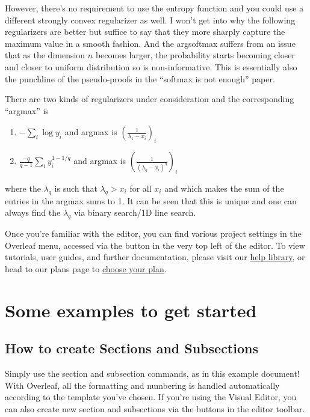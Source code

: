 \documentclass{article}
\begin{document}
However, there's no requirement to use the entropy function and you could use a different strongly convex regularizer as well. 
I won't get into why the following regularizers are better but suffice to say that they more sharply capture the maximum value in a smooth fashion. And the argsoftmax suffers from an issue that as the dimension $n$ becomes larger, the probability starts becoming closer and closer to uniform distribution so is non-informative. This is essentially also the punchline of the pseudo-proofs in the ``softmax is not enough'' paper.

There are two kinds of regularizers under consideration and the corresponding ``argmax'' is
\begin{enumerate}
\item $- \sum\limits_i \log y_i$ and argmax is $\left(\frac{1}{\lambda_1 - x_i}\right)_i$
\item $\frac{-q}{q-1}\sum\limits_i y_i^{1-1/q}$ and argmax is $\left(\frac{1}{(\lambda_q - x_i)^q}\right)_i$
\end{enumerate}
where the $\lambda_q$ is such that $\lambda_q > x_i$ for all $x_i$ and which makes the sum of the entries in the argmax sums to 1. It can be seen that this is unique and one can always find the $\lambda_q$ via binary search/1D line search.





Once you're familiar with the editor, you can find various project settings in the Overleaf menu, accessed via the button in the very top left of the editor. To view tutorials, user guides, and further documentation, please visit our \href{https://www.overleaf.com/learn}{help library}, or head to our plans page to \href{https://www.overleaf.com/user/subscription/plans}{choose your plan}.

\section{Some examples to get started}

\subsection{How to create Sections and Subsections}

Simply use the section and subsection commands, as in this example document! With Overleaf, all the formatting and numbering is handled automatically according to the template you've chosen. If you're using the Visual Editor, you can also create new section and subsections via the buttons in the editor toolbar.
\end{document}
